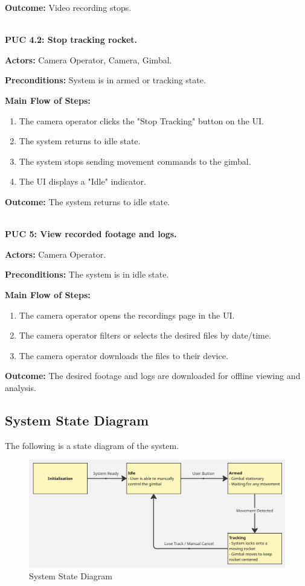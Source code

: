 \documentclass[12pt]{article}
\begin{document}
\textbf{Outcome:} Video recording stops.

~\\

\textbf{PUC 4.2: Stop tracking rocket.}

\textbf{Actors:} Camera Operator, Camera, Gimbal.

\textbf{Preconditions:} System is in armed or tracking state.

\textbf{Main Flow of Steps:}
\begin{enumerate}
  \item The camera operator clicks the "Stop Tracking" button on the UI.
  \item The system returns to idle state.
  \item The system stops sending movement commands to the gimbal.
  \item The UI displays a "Idle" indicator.
\end{enumerate}

\textbf{Outcome:} The system returns to idle state.

~\\

\textbf{PUC 5: View recorded footage and logs.}

\textbf{Actors:} Camera Operator.

\textbf{Preconditions:} The system is in idle state.

\textbf{Main Flow of Steps:}
\begin{enumerate}
  \item The camera operator opens the recordings page in the UI.
  \item The camera operator filters or selects the desired files by date/time.
  \item The camera operator downloads the files to their device.
\end{enumerate}

\textbf{Outcome:} The desired footage and logs are downloaded for offline viewing and analysis.

\subsection{System State Diagram}

The following is a state diagram of the system.

\begin{figure}[H]
  \centering
  \includegraphics[width=\textwidth,height=\textheight,keepaspectratio]{../Images/state_diagram.png}
  \caption{System State Diagram}
  \label{img:state-diagram}
\end{figure}
\end{document}
